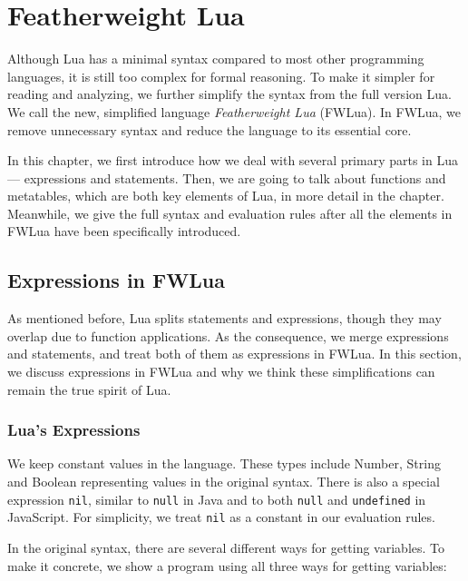 \newcommand{\abFunction}[2]{{\tt function} ~{#1}~{\tt return}~{#2}~{\tt end}}
\newcommand{\semanticFullRaw}[4]{{#1},{#2} \Downarrow {#3},{#4}}
\newcommand{\semanticFull}[4]{{#1},{#2} \Downarrow {#3}, {#4}}

\chapter{Featherweight Lua}
Although Lua has a minimal syntax compared to most other programming languages, it is still too complex for formal reasoning. To make it simpler for reading and analyzing, we further simplify the syntax from the full version Lua. We call the new, simplified language {\it Featherweight Lua} (FWLua). In FWLua, we remove unnecessary syntax and reduce the language to its essential core.

In this chapter, we first introduce how we deal with several primary parts in Lua --- expressions and statements. Then, we are going to talk about functions and metatables, which are both key elements of Lua, in more detail in the chapter. Meanwhile, we give the full syntax and evaluation rules after all the elements in FWLua have been specifically introduced.

\section{Expressions in FWLua}
As mentioned before, Lua splits statements and expressions, though they may overlap due to function applications. As the consequence, we merge expressions and statements, and treat both of them as expressions in FWLua. In this section, we discuss expressions in FWLua and why we think these simplifications can remain the true spirit of Lua. 

\subsection{Lua's Expressions}
We keep constant values in the language.
These types include Number, String and Boolean representing values in the original syntax.
There is also a special expression {\tt nil}, similar to {\tt null} in Java and to both {\tt null} and {\tt undefined} in JavaScript.
For simplicity, we treat {\tt nil} as a constant in our evaluation rules.

In the original syntax,
there are several different ways for getting variables.
To make it concrete, we show a program using all three ways for getting variables:


